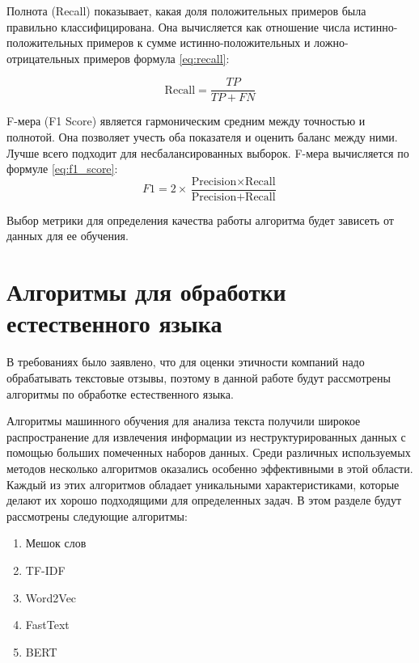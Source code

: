 \documentclass[PI, VKR]{HSEUniversity}
\begin{document}
Полнота (Recall) показывает, какая доля положительных примеров была правильно классифицирована. Она вычисляется как отношение числа истинно-положительных примеров к сумме истинно-положительных и ложно-отрицательных примеров формула \ref{eq:recall}:

\begin{equation}
\label{eq:recall}
  \text{{Recall}} = \frac{{TP}}{{TP + FN}}
\end{equation}

F-мера (F1 Score) является гармоническим средним между точностью и полнотой. Она позволяет учесть оба показателя и оценить баланс между ними. Лучше всего подходит для несбалансированных выборок. F-мера вычисляется по формуле \ref{eq:f1_score}:
\begin{equation}
\label{eq:f1_score}
F1 = 2 \times \frac{{\text{{Precision}} \times \text{{Recall}}}}{{\text{{Precision}} + \text{{Recall}}}}
\end{equation}

Выбор метрики для определения качества работы алгоритма будет зависеть от данных для ее обучения.
\section{Алгоритмы для обработки естественного языка}
\label{sec:org4fbc9b5}
В требованиях было заявлено, что для оценки этичности компаний надо обрабатывать текстовые отзывы, поэтому в данной работе будут рассмотрены алгоритмы по обработке естественного языка.

Алгоритмы машинного обучения для анализа текста получили широкое распространение для извлечения информации из неструктурированных данных с помощью больших помеченных наборов данных. Среди различных используемых методов несколько алгоритмов оказались особенно эффективными в этой области. Каждый из этих алгоритмов обладает уникальными характеристиками, которые делают их хорошо подходящими для определенных задач. В этом разделе будут рассмотрены следующие алгоритмы:
\begin{enumerate}
\item Мешок слов
\item TF-IDF
\item Word2Vec
\item FastText
\item BERT
\end{enumerate}
\end{document}
